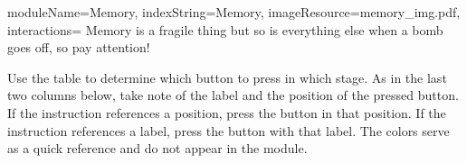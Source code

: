 \documentclass{../../ktane-mod}
\begin{document}
\begin{module}{
  moduleName=Memory,
  indexString=Memory,
  imageResource=memory_img.pdf,
  interactions=\keysymbol
}
{
  Memory is a fragile thing but so is everything else when a bomb goes off, so pay attention!
}
  \begin{bulletlist}
  \end{bulletlist}

  Use the table to determine which button to press in which stage.
  As in the last two columns below, take note of the label and the position of the pressed button.
  If the instruction references a position, press the button in that position.
  If the instruction references a label, press the button with that label.
  The colors serve as a quick reference and do not appear in the module.


\end{module}
\end{document}
